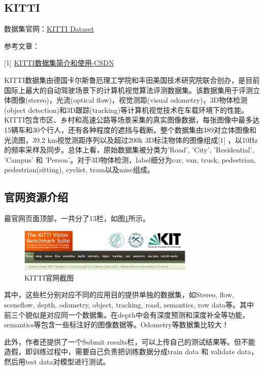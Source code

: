 \subsection{KITTI}

数据集官网：\href{http://www.cvlibs.net/datasets/kitti/index.php}{KITTI Dataset}

参考文章：

[1] \href{https://blog.csdn.net/Solomon1558/article/details/70173223}{KITTI数据集简介和使用-CSDN}

KITTI数据集由德国卡尔斯鲁厄理工学院和丰田美国技术研究院联合创办，是目前国际上最大的自动驾驶场景下的计算机视觉算法评测数据集。该数据集用于评测立体图像(stereo)，光流(optical flow)，视觉测距(visual odometry)，3D物体检测(object detection)和3D跟踪(tracking)等计算机视觉技术在车载环境下的性能。KITTI包含市区、乡村和高速公路等场景采集的真实图像数据，每张图像中最多达15辆车和30个行人，还有各种程度的遮挡与截断。整个数据集由389对立体图像和光流图，39.2 km视觉测距序列以及超过200k 3D标注物体的图像组成[1] ，以10Hz的频率采样及同步。总体上看，原始数据集被分类为’Road’, ’City’, ’Residential’, ’Campus’ 和 ’Person’。对于3D物体检测，label细分为car, van, truck, pedestrian, pedestrian(sitting), cyclist, tram以及misc组成。

\subsection{官网资源介绍}

最官网页面顶部，一共分了13栏，如图\ref{KITTI0}所示。

\begin{figure}[!hbtp]
\centering
\includegraphics[width=0.75\textwidth]{SemanticSLAM/KITTI0.png}
\caption{KITTI官网截图}
\label{KITTI0}
\end{figure}

其中，这些栏分别对应不同的应用目的提供单独的数据集，如Stereo, flow, sceneflow, depth, odometry, object, tracking, road, semantics, row data等。其中前三个貌似是对应同一个数据集。在depth中会有深度预测和深度补全等功能，semantics等包含一些标注好的图像数据等。Odometry等数据集比较大！

此外，作者还提供了一个Submit results栏，可以上传自己的测试结果等。但不能造假，即训练过程中，需要自己负责把训练数据分成train data 和 validate data， 然后用test data对模型进行测试。

